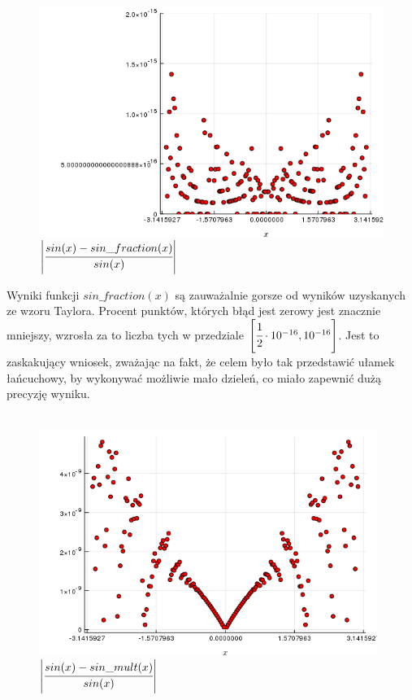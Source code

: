 \documentclass[a4paper]{article}
\begin{document}
\begin{figure}[h!]
  \includegraphics[width=13cm]{sin_fraction.png}
  \caption{$\left| \cfrac{sin(x) - sin\_fraction(x)}{sin(x)} \right| $}
\end{figure}

Wyniki funkcji $sin\_fraction(x)$ są zauważalnie gorsze od wyników uzyskanych ze wzoru Taylora. Procent punktów, których błąd jest zerowy jest znacznie mniejszy, wzrosła za to liczba tych w przedziale $ \left[ \cfrac{1}{2} \cdot 10^{-16}, 10^{-16} \right] $. Jest to zaskakujący wniosek, zważając na fakt, że celem było tak przedstawić ułamek łańcuchowy, by wykonywać możliwie mało dzieleń, co miało zapewnić dużą precyzję wyniku.\\\\

\begin{figure}[h!]
  \includegraphics[width=11cm]{sin_mult.png}
  \caption{$\left| \cfrac{sin(x) - sin\_mult(x)}{sin(x)} \right| $}
\end{figure}
\newpage
\end{document}
